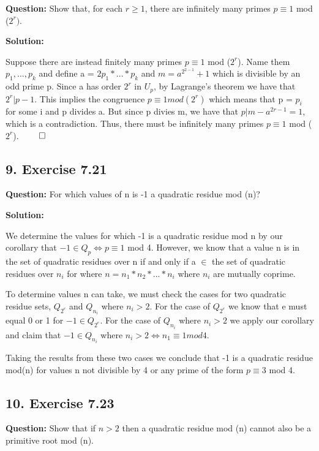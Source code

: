 \documentclass{article}
\begin{document}
\begin{spacing}{1.1}
\textbf{Question: }Show that, for each $r \geq 1$, there are infinitely many primes $p \equiv 1$ mod ($2^r)$.  

\textbf{Solution: }

Suppose there are instead finitely many primes $p \equiv 1$ mod ($2^r$).  Name them $p_1,...,p_k$ and define a = $2p_1*...*p_k$ and $m = a^{2^{2-1}} + 1$ which is divisible by an odd prime p.  Since a has order $2^r$ in $U_p$, by Lagrange's theorem we have that $2^r | p-1$.  This implies the congruence $p \equiv 1 mod (2^r)$ which means that p = $p_i$ for some i and p divides a.  But since p divies m, we have that $p|m - a^{2{r-1}} = 1$, which is a contradiction.  Thus, there must be infinitely many primes $p \equiv 1$ mod ($2^r$).  $\qed$


\vfill

\subsection{9.  Exercise 7.21} 

\textbf{Question: }For which values of n is -1 a quadratic residue mod (n)?

\textbf{Solution: }

We determine the values for which -1 is a quadratic residue mod n by our corollary that $-1 \in Q_p \iff p \equiv 1$ mod 4.  However, we know that a value n is in the set of quadratic residues over n if and only if a $\in$ the set of quadratic residues over $n_i$ for where $n = n_1*n_2*...*n_i$ where $n_i$ are mutually coprime.  

To determine values n can take, we must check the cases for two quadratic residue sets, $Q_{2^e}$ and $Q_{n_i}$ where $n_i > 2$.  For the case of $Q_{2^e}$ we know that e must equal 0 or 1 for $-1 \in Q_{2^e}$.  For the case of $Q_{n_i}$ where $n_i > 2$ we apply our corollary and claim that $-1 \in Q_{n_i}$ where $n_i > 2 \iff n_1 \equiv 1 mod 4$.  

Taking the results from these two cases we conclude that -1 is a quadratic residue mod(n) for values n not divisible by 4 or any prime of the form $p\equiv 3$ mod 4.  

\vfill

\subsection{10.  Exercise 7.23} 

\textbf{Question: }Show that if $n > 2$ then a quadratic residue mod (n) cannot also be a primitive root mod (n).  


\end{spacing}
\end{document}

